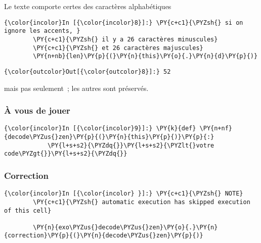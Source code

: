     Le texte comporte certes des caractères alphabétiques

    \begin{Verbatim}[commandchars=\\\{\}]
{\color{incolor}In [{\color{incolor}8}]:} \PY{c+c1}{\PYZsh{} si on ignore les accents, }
        \PY{c+c1}{\PYZsh{} il y a 26 caractères minuscules}
        \PY{c+c1}{\PYZsh{} et 26 caractères majuscules}
        \PY{n+nb}{len}\PY{p}{(}\PY{n}{this}\PY{o}{.}\PY{n}{d}\PY{p}{)}
\end{Verbatim}


\begin{Verbatim}[commandchars=\\\{\}]
{\color{outcolor}Out[{\color{outcolor}8}]:} 52
\end{Verbatim}
            
    mais pas seulement~; les autres sont préservés.

    \hypertarget{uxe0-vous-de-jouer}{%
\subsubsection{À vous de jouer}\label{uxe0-vous-de-jouer}}

    \begin{Verbatim}[commandchars=\\\{\}]
{\color{incolor}In [{\color{incolor}9}]:} \PY{k}{def} \PY{n+nf}{decode\PYZus{}zen}\PY{p}{(}\PY{n}{this}\PY{p}{)}\PY{p}{:}
            \PY{l+s+s2}{\PYZdq{}}\PY{l+s+s2}{\PYZlt{}votre code\PYZgt{}}\PY{l+s+s2}{\PYZdq{}}
\end{Verbatim}


    \hypertarget{correction}{%
\subsubsection{Correction}\label{correction}}

    \begin{Verbatim}[commandchars=\\\{\}]
{\color{incolor}In [{\color{incolor} }]:} \PY{c+c1}{\PYZsh{} NOTE}
        \PY{c+c1}{\PYZsh{} automatic execution has skipped execution of this cell}
        
        \PY{n}{exo\PYZus{}decode\PYZus{}zen}\PY{o}{.}\PY{n}{correction}\PY{p}{(}\PY{n}{decode\PYZus{}zen}\PY{p}{)}
\end{Verbatim}



    
    
    

